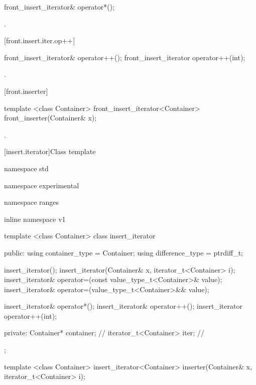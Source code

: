 %
\begin{itemdecl}
front_insert_iterator& operator*();
\end{itemdecl}

\begin{itemdescr}
\pnum
\returns
{}.
\end{itemdescr}

[front.insert.iter.op++]{}

%
\begin{itemdecl}
front_insert_iterator& operator++();
front_insert_iterator operator++(int);
\end{itemdecl}

\begin{itemdescr}
\pnum
\returns
{}.
\end{itemdescr}

[front.inserter]{}

%
\begin{itemdecl}
template <class Container>
  front_insert_iterator<Container> front_inserter(Container& x);
\end{itemdecl}

\begin{itemdescr}
\pnum
\returns
{}.
\end{itemdescr}

[insert.iterator]{Class template }

%
\begin{codeblock}
namespace std { namespace experimental { namespace ranges { inline namespace v1 {
  template <class Container>
  class insert_iterator {
  public:
    using container_type = Container;
    using difference_type = ptrdiff_t;

    insert_iterator();
    insert_iterator(Container& x, iterator_t<Container> i);
    insert_iterator&
      operator=(const value_type_t<Container>& value);
    insert_iterator&
      operator=(value_type_t<Container>&& value);

    insert_iterator& operator*();
    insert_iterator& operator++();
    insert_iterator operator++(int);

  private:
    Container* container;       // \expos
    iterator_t<Container> iter; // \expos
  };

  template <class Container>
    insert_iterator<Container> inserter(Container& x, iterator_t<Container> i);
}}}}
\end{codeblock}

